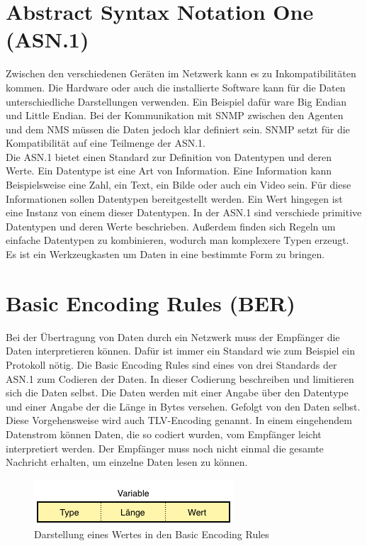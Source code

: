 \documentclass[11pt,a4paper]{article}
\begin{document}
\section{Abstract Syntax Notation One (ASN.1)}
Zwischen den verschiedenen Geräten im Netzwerk kann es zu Inkompatibilitäten kommen. Die Hardware oder auch die installierte Software kann für die Daten unterschiedliche Darstellungen verwenden. Ein Beispiel dafür ware Big Endian und Little Endian. Bei der Kommunikation mit SNMP zwischen den Agenten und dem NMS müssen die Daten jedoch klar definiert sein. SNMP setzt für die Kompatibilität auf eine Teilmenge der ASN.1.\\
Die ASN.1 bietet einen Standard zur Definition von Datentypen und deren Werte. Ein Datentype ist eine Art von Information. Eine Information kann Beispielsweise eine Zahl, ein Text, ein Bilde oder auch ein Video sein. Für diese Informationen sollen Datentypen bereitgestellt werden. Ein Wert hingegen ist eine Instanz von einem dieser Datentypen. In der ASN.1 sind verschiede primitive Datentypen und deren Werte beschrieben. Außerdem finden sich Regeln um einfache Datentypen zu kombinieren, wodurch man komplexere Typen erzeugt. Es ist ein Werkzeugkasten um Daten in eine bestimmte  Form zu bringen.
\\

\section{Basic Encoding Rules (BER)}
Bei der Übertragung von Daten durch ein Netzwerk muss der Empfänger die Daten interpretieren können. Dafür ist immer ein Standard wie zum Beispiel ein Protokoll nötig. Die Basic Encoding Rules sind eines von drei Standards der ASN.1 zum Codieren der Daten. In dieser Codierung beschreiben und limitieren sich die Daten selbst. Die Daten werden mit einer Angabe über den Datentype und einer Angabe der die Länge in Bytes versehen. Gefolgt von den Daten selbst. Diese Vorgehensweise wird auch TLV-Encoding genannt. In einem eingehendem Datenstrom können Daten, die so codiert wurden, vom Empfänger leicht interpretiert werden. Der Empfänger muss noch nicht einmal die gesamte Nachricht erhalten, um einzelne Daten lesen zu können.
\\
\begin{figure}[h]
	\centering
	\includegraphics[scale=1]{Bilder/BasicEncodingRules}
	\caption{Darstellung eines Wertes in den Basic Encoding Rules}
\end{figure}
\end{document}
